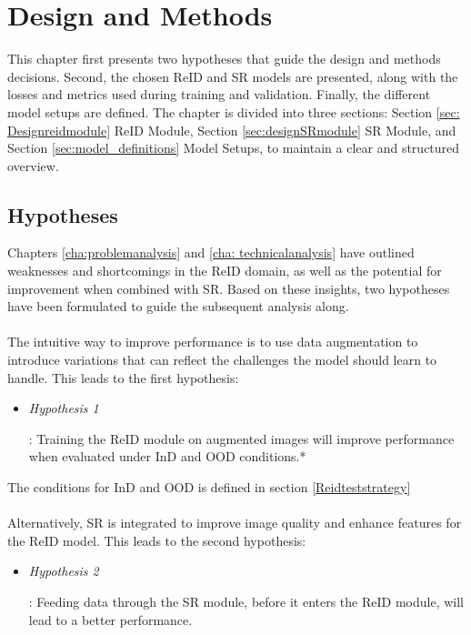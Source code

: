 \chapter{Design and Methods} \label{cha: designandmethods}

This chapter first presents two hypotheses that guide the design and methods decisions. Second, the chosen \acs{ReID} and \acs{SR} models are presented, along with the losses and metrics used during training and validation. Finally, the different model setups are defined. The chapter is divided into three sections: Section \ref{sec: Designreidmodule} \acs{ReID} Module,  Section \ref{sec:designSRmodule} \acs{SR} Module, and Section \ref{sec:model_definitions} Model Setups, to maintain a clear and structured overview. 

\section{Hypotheses}\label{sec:hypotheses}
Chapters \ref{cha:problemanalysis} and \ref{cha: technicalanalysis} have outlined weaknesses and shortcomings in the \acs{ReID} domain, as well as the potential for improvement when combined with \acs{SR}. Based on these insights, two hypotheses have been formulated to guide the subsequent analysis along.
\\\\
The intuitive way to improve performance is to use data augmentation to introduce variations that can reflect the challenges the model should learn to handle. This leads to the first hypothesis:

\begin{itemize}
    \item \hypertarget{hypothesis:1}{\textit{Hypothesis 1}}: Training the \acs{ReID} module on augmented images will improve performance when evaluated under \acf{InD} and \acf{OOD} conditions.*
\end{itemize}
\noindent * The conditions for \acs{InD} and \acs{OOD} is defined in section \ref{Reidteststrategy}
\\\\
Alternatively, \acs{SR} is integrated to improve image quality and enhance features for the \acs{ReID} model. This leads to the second hypothesis:

\begin{itemize}
    \item \hypertarget{hypothesis:2}{\textit{Hypothesis 2}}: Feeding data through the \acs{SR} module, before it enters the \acs{ReID} module, will lead to a better performance. 
\end{itemize}

